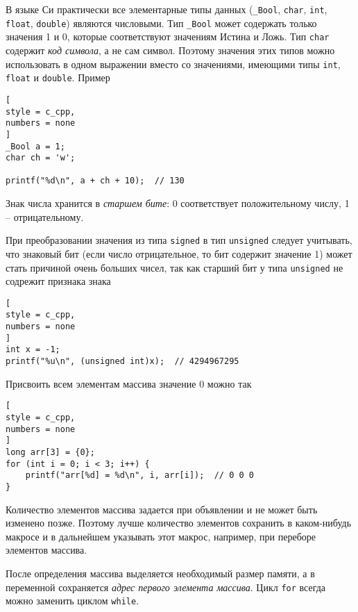 \documentclass[%
	11pt,
	a4paper,
	utf8,
		]{article}
\begin{document}
В языке Си практически все элементарные типы данных (\verb|_Bool|, \verb*|char|, \verb|int|, \verb|float|, \verb|double|) являются числовыми. Тип \verb|_Bool| может содержать только значения 1 и 0, которые соответствуют значениям Истина и Ложь. Тип \verb|char| содержит \emph{код символа}, а не сам символ. Поэтому значения этих типов можно использовать в одном выражении вместо со значениями, имеющими типы \verb|int|, \verb|float| и \verb|double|. Пример
\begin{lstlisting}[
style = c_cpp,
numbers = none
]
_Bool a = 1;
char ch = 'w';

printf("%d\n", a + ch + 10);  // 130
\end{lstlisting}

Знак числа хранится в \emph{старшем бите}: 0 соответствует положительному числу, 1 -- отрицательному.

При преобразовании значения из типа \verb|signed| в тип \verb|unsigned| следует учитывать, что знаковый бит (если число отрицательное, то бит содержит значение 1) может стать причиной очень больших чисел, так как старший бит у типа \verb|unsigned| не содрежит признака знака
\begin{lstlisting}[
style = c_cpp,
numbers = none
]
int x = -1;
printf("%u\n", (unsigned int)x);  // 4294967295
\end{lstlisting}

Присвоить всем элементам массива значение 0 можно так
\begin{lstlisting}[
style = c_cpp,
numbers = none
]
long arr[3] = {0};
for (int i = 0; i < 3; i++) {
    printf("arr[%d] = %d\n", i, arr[i]);  // 0 0 0
}
\end{lstlisting}

Количество элементов массива задается при объявлении и не может быть изменено позже. Поэтому лучше количество элементов сохранить в каком-нибудь макросе и в дальнейшем указывать этот макрос, например, при переборе элементов массива.


После определения массива выделяется необходимый размер памяти, а в переменной сохраняется \emph{адрес первого элемента массива}. Цикл \verb|for| всегда можно заменить циклом \verb|while|.
\end{document}

